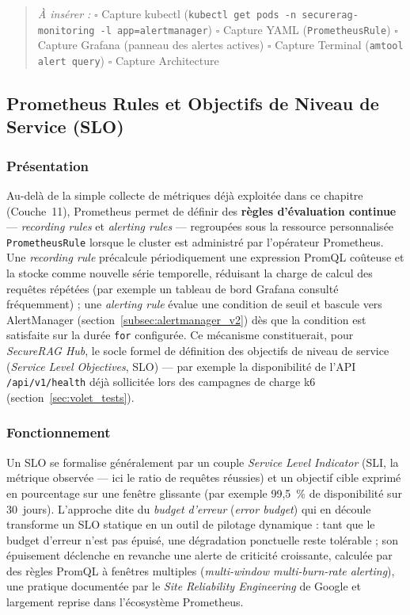\begin{quote}
\scriptsize
\textit{À insérer :} \quad
$\square$ Capture kubectl (\texttt{kubectl get pods -n securerag-monitoring -l app=alertmanager}) \quad
$\square$ Capture YAML (\texttt{PrometheusRule}) \quad
$\square$ Capture Grafana (panneau des alertes actives) \quad
$\square$ Capture Terminal (\texttt{amtool alert query}) \quad
$\square$ Capture Architecture
\end{quote}


\subsection{Prometheus Rules et Objectifs de Niveau de Service (SLO)}
\label{subsec:prometheus_rules_slo_v2}

\subsubsection{Présentation}
Au-delà de la simple collecte de métriques déjà exploitée dans ce chapitre (Couche~11), Prometheus permet de définir des \textbf{règles d'évaluation continue} — \textit{recording rules} et \textit{alerting rules} — regroupées sous la ressource personnalisée \texttt{PrometheusRule} lorsque le cluster est administré par l'opérateur Prometheus. Une \textit{recording rule} précalcule périodiquement une expression PromQL coûteuse et la stocke comme nouvelle série temporelle, réduisant la charge de calcul des requêtes répétées (par exemple un tableau de bord Grafana consulté fréquemment) ; une \textit{alerting rule} évalue une condition de seuil et bascule vers AlertManager (section~\ref{subsec:alertmanager_v2}) dès que la condition est satisfaite sur la durée \texttt{for} configurée. Ce mécanisme constituerait, pour \textit{SecureRAG Hub}, le socle formel de définition des objectifs de niveau de service (\textit{Service Level Objectives}, SLO) — par exemple la disponibilité de l'API \texttt{/api/v1/health} déjà sollicitée lors des campagnes de charge k6 (section~\ref{sec:volet_tests}).

\subsubsection{Fonctionnement}
Un SLO se formalise généralement par un couple \textit{Service Level Indicator} (SLI, la métrique observée — ici le ratio de requêtes réussies) et un objectif cible exprimé en pourcentage sur une fenêtre glissante (par exemple 99,5~\% de disponibilité sur 30~jours). L'approche dite du \textit{budget d'erreur} (\textit{error budget}) qui en découle transforme un SLO statique en un outil de pilotage dynamique : tant que le budget d'erreur n'est pas épuisé, une dégradation ponctuelle reste tolérable ; son épuisement déclenche en revanche une alerte de criticité croissante, calculée par des règles PromQL à fenêtres multiples (\textit{multi-window multi-burn-rate alerting}), une pratique documentée par le \textit{Site Reliability Engineering} de Google et largement reprise dans l'écosystème Prometheus.

